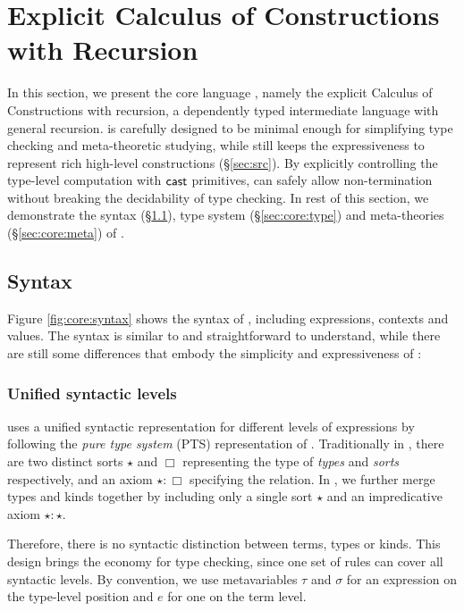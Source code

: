 \section{Explicit Calculus of Constructions with Recursion}\label{sec:core}

In this section, we present the core language \name, namely the explicit Calculus of Constructions with recursion, a dependently typed intermediate language with general recursion. \name is carefully designed to be minimal enough for simplifying type checking and meta-theoretic studying, while still keeps the expressiveness to represent rich high-level constructions (\S \ref{sec:src}). By explicitly controlling the type-level computation with $\mathsf{cast}$ primitives, \name can safely allow non-termination without breaking the decidability of type checking. In rest of this section, we demonstrate the syntax (\S \ref{sec:core:syn}), type system (\S \ref{sec:core:type}) and meta-theories (\S \ref{sec:core:meta}) of \name.

\subsection{Syntax}\label{sec:core:syn}
Figure \ref{fig:core:syntax} shows the syntax of \name, including expressions, contexts and values. The syntax is similar to \cc and straightforward to understand, while there are still some differences that embody the simplicity and expressiveness of \name:

\subsubsection{Unified syntactic levels}
\name uses a unified syntactic representation for different levels of expressions by following the \emph{pure type system} (PTS) representation of \cc. Traditionally in \cc, there are two distinct sorts $\star$ and $\Box$ representing the type of \emph{types} and \emph{sorts} respectively, and an axiom $\star:\Box$ specifying the relation. In \name, we further merge types and kinds together by including only a single sort $\star$ and an impredicative axiom $\star:\star$. 

Therefore, there is no syntactic distinction between terms, types or kinds. This design brings the economy for type checking, since one set of rules can cover all syntactic levels. By convention, we use metavariables $\tau$ and $\sigma$ for an expression on the type-level position and $e$ for one on the term level.

